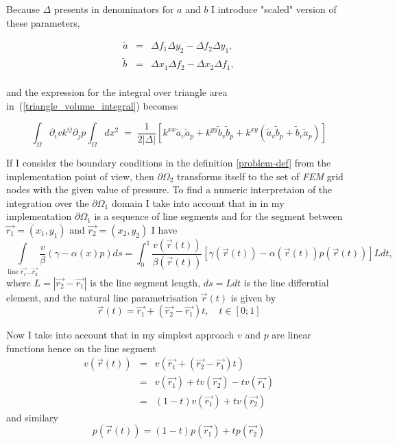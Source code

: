 \documentclass{article}
\def\eqn#1{\begin{displaymath}#1\end{displaymath}}
\def\eqnl#1#2{\begin{equation}\label{#1}#2\end{equation}}
\def\eqnm#1{\begin{eqnarray*}#1\end{eqnarray*}}
\def\arr#1#2{\begin{array}{#1}#2\end{array}}
\def\rf#1{(\ref{#1})}
\def\EQS{\; = \;}
\theoremstyle{marginbreak} \theorembodyfont{\itshape}
\begin{document}
Because $\Delta$ presents in denominators for $a$ and  $b$ I introduce
"scaled" version of these parameters,

\eqnl{scaled_lin_coef}{
\arr{ccc}{
\tilde{a} &=& \Delta f_1 \Delta y_2 - \Delta f_2 \Delta y_1, \\
\tilde{b} &=& \Delta x_1 \Delta f_2 - \Delta x_2 \Delta f_1, \\
} }

and the expression for the integral over triangle area
in~\rf{triangle_volume_integral} becomes

\eqnl{triangle_volume_integral2}{
\int_\Omega  \partial_i v k^{ij} \partial_j p \int_\Omega dx^2
\EQS \frac{1}{2|\Delta|}
[k^{xx} \tilde{a}_v \tilde{a}_p + k^{yy} \tilde{b}_v \tilde{b}_p
+ k^{xy} (\tilde{a}_v \tilde{b}_p + \tilde{b}_v \tilde{a}_p)]
}

If I consider the boundary conditions in the definition \ref{problem-def}
from the implementation point of view, then $\partial\Omega_2$ transforms
itself to the set of {\itshape FEM} grid nodes with the given value of
pressure. To find a numeric interpretaion of the integration over
the $\partial\Omega_1$ domain I take into account that in in my
implementation $\partial\Omega_1$ is a sequence of line segments and for
the segment between $\vec{r_1} = (x_1, y_1)$
and $\vec{r_2} = (x_2, y_2)$ I have
\eqnl{int-line-edge1}{
\int\limits_{\mbox{line {}} \vec{r_1} \dots \vec{r_2}}
\frac{v}{\beta} (\gamma -  \alpha(x) p) ds
=
\int_0^1 \frac{v(\vec{r}(t))}{\beta(\vec{r}(t))}
  [\gamma(\vec{r}(t)) -  \alpha(\vec{r}(t)) p(\vec{r}(t))] L dt,
}
where $L = |\vec{r_2} - \vec{r_1}|$ is the line segment length,
$ds = Ldt$ is the line differntial element,
and the natural line parametrisation $\vec{r}(t)$ is given by
\begin{equation}
\vec{r}(t) = \vec{r_1} + (\vec{r_2} - \vec{r_1}) t, \quad t \in [0; 1]
\end{equation}

Now I take into account that in my simplest approach $v$ and $p$ are linear
functions hence on the line segment
\eqnm{
v(\vec{r}(t))
&=& v(\vec{r_1} + (\vec{r_2} - \vec{r_1}) t)
\\&=& v(\vec{r_1}) + t v(\vec{r_2}) - t v(\vec{r_1})
\\&=& (1 - t)v(\vec{r_1}) + t v(\vec{r_2})
}
and similary
\eqn{
p(\vec{r}(t)) = (1 - t)p(\vec{r_1}) + t p(\vec{r_2})
}

\end{document}
